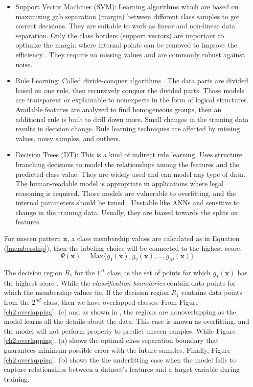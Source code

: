 \begin{itemize}
    \item Support Vector Machines (SVM): Learning algorithms which are based on maximizing gab separation (margin) between different class samples to get correct decisions. They are suitable to work as linear and non-linear data separation. Only the class borders (support vectors) are important to optimize the margin where internal points can be removed to improve the efficiency \cite{nalepa2019}. They require no missing values and are commonly robust against noise. \item Rule Learning: Called divide-conquer algorithms \cite{furnkranz2012}. The data parts are divided based on one rule, then recursively conquer the divided parts. Those models are transparent or explainable to nonexperts in the form of logical structures. Available features are analyzed to find homogeneous groups, then an additional rule is built to drill down more. Small changes in the training data results in decision change. Rule learning techniques are affected by missing values, noisy samples, and outliers.
    \item Decision Trees (DT): This is a kind of indirect rule learning. Uses structure branching decisions to model the relationships among the features and the predicted class value. They are widely used and can model any type of data. The human-readable model is appropriate in applications where legal reasoning is required. Those models are vulnerable to overfitting, and the internal parameters should be tuned \cite{geron2019}. Unstable like ANNs and sensitive to change in the training data. Usually, they are biased towards the splits on features.               
\end{itemize}

For unseen pattern $\textbf{x}$, a class membership values are calculated as in Equation (\ref{membership}), then the labeling choice will be connected to the highest score.
\begin{equation}\label{membership}
\Psi(\textbf{x})=\text{Max}\{g_1(\textbf{x}),g_2(\textbf{x}),\dots,g_M(\textbf{x})\}
\end{equation}


 The decision region $R_1$ for the $1^{st}$ class, is the set of points for which $g_1(\textbf{x})$ has the highest score \cite{kuncheva2014}. While the \textit{classification boundaries} contain data points for which the membership values tie. If the decision region $R_1$ contains data points from the $2^{nd}$ class, then we have overlapped classes. From Figure \ref{ch2:overlapping}. (c) and as shown in \cite{galbusera2019}, the regions are nonoverlapping as the model learns all the details about the data. This case is known as overfitting, and the model will not perform properly to predict unseen samples. While  Figure \ref{ch2:overlapping}. (a) shows the optimal class separation boundary that guarantees minimum possible error with the future samples. Finally,  Figure \ref{ch2:overlapping}. (b) shows the the underfitting case when the model fails to capture relationships between a dataset’s features and a target variable during training. 
 
